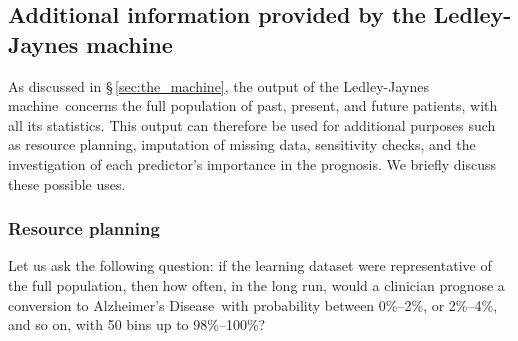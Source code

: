 \documentclass[utf8]{FrontiersinHarvard_mod} %
\newcommand*{\sect}{\S}%
\renewcommand*{\|}[1][]{\nonscript\:#1\vert\nonscript\:\mathopen{}}
\newcommand*{\ad}{Alzheimer's Disease}
\newcommand*{\ljm}{Ledley-Jaynes machine}
\begin{document}
\bigskip%
\subsection{Additional information provided by the \ljm}
\label{sec:additional_results}

As discussed in \sect\,\ref{sec:the_machine}, the output of the \ljm\ concerns the full population of past, present, and future patients, with all its statistics. This output can therefore be used for additional purposes such as resource planning, imputation of missing data, sensitivity checks, and the investigation of each predictor's importance in the prognosis. We briefly discuss these possible uses.

\subsubsection{Resource planning}
\label{sec:resource_planning}

Let us ask the following question: if the learning dataset were representative of the full population, then how often, in the long run, would a clinician prognose a conversion to \ad\ with probability between 0\%--2\%, or 2\%--4\%, and so on, with 50 bins up to 98\%--100\%?
\end{document}
